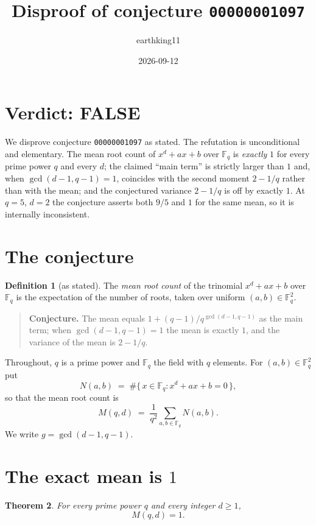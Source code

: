 \documentclass[11pt]{article}
\title{Disproof of conjecture \texttt{00000001097}}
\author{earthking11}
\date{2026-09-12}
\newtheorem{theorem}{Theorem}
\theoremstyle{definition}
\newtheorem{definition}[theorem]{Definition}
\theoremstyle{remark}
\begin{document}
\maketitle

\section*{Verdict: FALSE}

We disprove conjecture \texttt{00000001097} as stated. The refutation is
unconditional and elementary. The mean root count of $x^d + ax + b$ over
$\mathbb{F}_q$ is \emph{exactly} $1$ for every prime power $q$ and every $d$; the
claimed ``main term'' is strictly larger than $1$ and, when
$\gcd(d-1,q-1)=1$, coincides with the second moment $2-1/q$ rather than with the
mean; and the conjectured variance $2-1/q$ is off by exactly $1$. At $q=5$, $d=2$
the conjecture asserts both $9/5$ and $1$ for the same mean, so it is internally
inconsistent.

\section{The conjecture}

\begin{definition}[as stated]
The \emph{mean root count} of the trinomial $x^d + ax + b$ over $\mathbb{F}_q$ is
the expectation of the number of roots, taken over uniform
$(a,b) \in \mathbb{F}_q^2$.
\end{definition}

\begin{quote}
\textbf{Conjecture.} The mean equals $1 + (q-1)/q^{\gcd(d-1,q-1)}$ as the main
term; when $\gcd(d-1,q-1) = 1$ the mean is exactly $1$, and the variance of the
mean is $2 - 1/q$.
\end{quote}

Throughout, $q$ is a prime power and $\mathbb{F}_q$ the field with $q$ elements.
For $(a,b) \in \mathbb{F}_q^2$ put
\[
N(a,b) \;=\; \#\{\,x \in \mathbb{F}_q : x^d + ax + b = 0\,\},
\]
so that the mean root count is
\[
M(q,d) \;=\; \frac{1}{q^2} \sum_{a,b \in \mathbb{F}_q} N(a,b).
\]
We write $g = \gcd(d-1, q-1)$.

\section{The exact mean is $1$}

\begin{theorem}\label{thm:mean-one}
For every prime power $q$ and every integer $d \ge 1$,
\[
M(q,d) = 1.
\]
\end{theorem}
\end{document}
